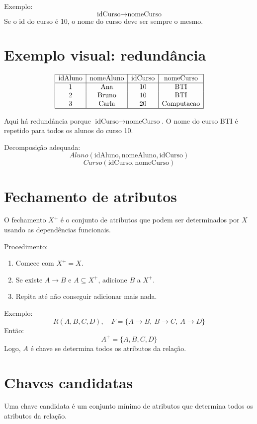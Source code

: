 \documentclass[12pt,a4paper]{article}
\begin{document}
Exemplo:
\[
\text{idCurso} \rightarrow \text{nomeCurso}
\]
Se o id do curso é 10, o nome do curso deve ser sempre o mesmo.

\section{Exemplo visual: redundância}
\[
\begin{array}{|c|c|c|c|}
\hline
\text{idAluno} & \text{nomeAluno} & \text{idCurso} & \text{nomeCurso}\\
\hline
1 & \text{Ana} & 10 & \text{BTI}\\
2 & \text{Bruno} & 10 & \text{BTI}\\
3 & \text{Carla} & 20 & \text{Computacao}\\
\hline
\end{array}
\]

Aqui há redundância porque $\text{idCurso} \rightarrow \text{nomeCurso}$. O nome do curso BTI é repetido para todos os alunos do curso 10.

Decomposição adequada:
\[
Aluno(\text{idAluno}, \text{nomeAluno}, \text{idCurso})
\]
\[
Curso(\text{idCurso}, \text{nomeCurso})
\]

\section{Fechamento de atributos}
O fechamento $X^+$ é o conjunto de atributos que podem ser determinados por $X$ usando as dependências funcionais.

Procedimento:
\begin{enumerate}
    \item Comece com $X^+ = X$.
    \item Se existe $A \rightarrow B$ e $A \subseteq X^+$, adicione $B$ a $X^+$.
    \item Repita até não conseguir adicionar mais nada.
\end{enumerate}

Exemplo:
\[
R(A,B,C,D),\quad F=\{A\rightarrow B,\ B\rightarrow C,\ A\rightarrow D\}
\]
Então:
\[
A^+ = \{A,B,C,D\}
\]
Logo, $A$ é chave se determina todos os atributos da relação.

\section{Chaves candidatas}
Uma chave candidata é um conjunto mínimo de atributos que determina todos os atributos da relação.
\end{document}
